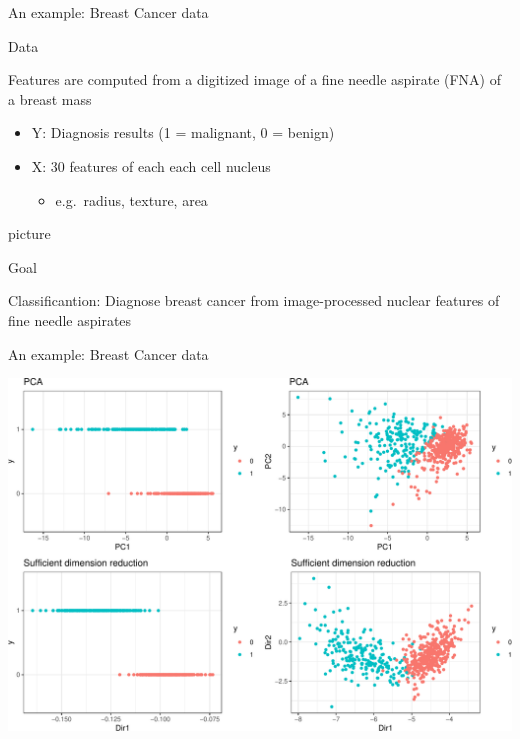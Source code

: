\documentclass[ignorenonframetext,]{beamer}
\providecommand{\tightlist}{%
  \setlength{\itemsep}{0pt}\setlength{\parskip}{0pt}}
\begin{document}
\begin{frame}{An example: Breast Cancer data}

\begin{block}{Data}

Features are computed from a digitized image of a fine needle aspirate
(FNA) of a breast mass

\begin{itemize}
\tightlist
\item
  Y: Diagnosis results (1 = malignant, 0 = benign)
\item
  X: 30 features of each each cell nucleus

  \begin{itemize}
  \tightlist
  \item
    e.g.~radius, texture, area
  \end{itemize}
\end{itemize}

picture

\end{block}

\begin{block}{Goal}

Classificantion: Diagnose breast cancer from image-processed nuclear
features of fine needle aspirates

\end{block}

\end{frame}

\begin{frame}{An example: Breast Cancer data}

\begin{center}\includegraphics{SDR_reps_slides_final_merck_files/figure-beamer/unnamed-chunk-2-1} \end{center}

\end{frame}
\end{document}
